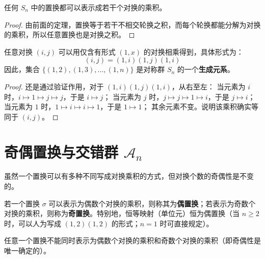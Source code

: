 \documentclass[11pt]{article}
\begin{document}
\begin{cncorollary}
    任何 $S_n$ 中的置换都可以表示成若干个对换的乘积。
\end{cncorollary}
\begin{proof}
    由前面的定理，置换等于若干不相交轮换之积，而每个轮换都能分解为对换的乘积，所以任意置换也是对换之积。
\end{proof}

\begin{cnproperty}[对称群的生成元集]
    任意对换 $(i, j)$ 可以用仅含有形式 $(1, x)$ 的对换相乘得到，具体形式为：
    \[
        (i, j) = (1, i)(1, j)(1, i)
    \]
    因此，集合 $\{(1, 2), (1, 3), \dots, (1, n)\}$ 是对称群 $S_n$ 的一个\textbf{生成元系}。
\end{cnproperty}
\begin{proof}
    还是通过验证作用，对于 $(1, i)(1, j)(1, i)$，从右至左：
    当元素为 $i$ 时，$i \mapsto 1 \mapsto j \mapsto j$，于是 $i \mapsto j$；
    当元素为 $j$ 时，$j \mapsto j \mapsto 1 \mapsto i$，于是 $j \mapsto i$；
    当元素为 $1$ 时，$1 \mapsto i \mapsto i \mapsto 1$，于是 $1 \mapsto 1$；
    其余元素不变。说明该乘积确实等同于 $(i, j)$。
\end{proof}

\section{奇偶置换与交错群 $\mathcal{A}_n$}

虽然一个置换可以有多种不同写成对换乘积的方式，但对换个数的奇偶性是不变的。

\begin{cndefinition}[奇置换与偶置换]
    若一个置换 $\sigma$ 可以表示为偶数个对换的乘积，则称其为\textbf{偶置换}；若表示为奇数个对换的乘积，则称为\textbf{奇置换}。特别地，恒等映射（单位元）恒为偶置换（当 $n \ge 2$ 时，可以人为写成 $(1,2)(1,2)$ 的形式；$n=1$ 时可直接规定）。
\end{cndefinition}

\begin{cntheorem}
    任意一个置换不能同时表示为偶数个对换的乘积和奇数个对换的乘积（即奇偶性是唯一确定的）。
\end{cntheorem}
\end{document}
